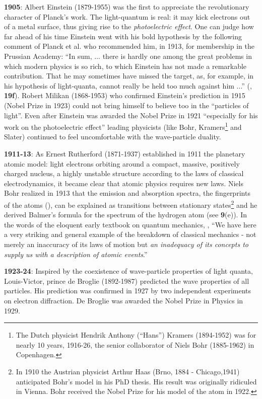{\bf 1905}: Albert Einstein (1879-1955) was the first to appreciate the
revolutionary character of Planck's work. The light-quantum is real: it may
kick electrons out of a metal surface, thus giving rise to the {\it photoelectric
effect}. One can judge how far ahead of his time Einstein went with his bold
hypothesis by the following comment of Planck et al. who recommended him, in
1913, for membership in the Prussian Academy: ``In sum, ... there is hardly
one among the great problems in which modern physics is so rich, to which
Einstein has not made a remarkable contribution. That he may sometimes have
missed the target, as, for example, in his hypothesis of light-quanta, cannot
really be held too much against him ...'' (\cite{P}, {\bf 19f}). Robert Milikan
 (1868-1953) who confirmed Einstein's prediction in 1915 (Nobel Prize in 1923)
could not bring himself to believe too in the ``particles of light''. Even after
 Einstein was awarded the Nobel Prize in 1921 ``especially for his work on the
photoelectric effect'' leading physicists (like Bohr, Kramers\footnote{The Dutch
physicist Hendrik Anthony (``Hans'') Kramers (1894-1952) was for nearly 10
years, 1916-26, the senior collaborator of Niels Bohr (1885-1962) in Copenhagen.} 
and Slater) continued to feel uncomfortable with the wave-particle duality.

{\bf 1911-13}: As Ernest Rutherford (1871-1937) established in 1911 the
planetary atomic model: light electrons orbiting around a compact, massive,
positively charged nucleus, a highly unstable structure according to the laws
of classical electrodynamics, it became clear that atomic physics requires new
laws. Niels Bohr realized in 1913 that the emission and absorption spectra,
the fingerprints of the atoms (\cite{B05}), can be explained as transitions
between stationary states\footnote{In 1910 the Austrian physicist Arthur Haas
(Brno, 1884 - Chicago,1941) anticipated Bohr's model in his PhD thesis. His
result was originally ridiculed in Vienna. Bohr received the Nobel Prize for 
his model of the atom in 1922.} and he derived Balmer's formula for
 the spectrum of the hydrogen atom (see \cite{P86} {\bf 9}(e)). In the 
 words of the eloquent early textbook on quantum mechanics, \cite{D30}, 
 ``We have here a very striking and general example of the breakdown
 of classical mechanics - not merely an inaccuracy of its laws of motion but
{\it an inadequacy of its concepts to supply us with a description of atomic
events}.'' 

{\bf 1923-24}: Inspired by the coexistence of wave-particle properties of light
quanta, Louis-Victor, prince de Broglie (1892-1987) predicted the wave
properties of all particles. His prediction was confirmed in 1927 by two
independent experiments on electron diffraction. De Broglie was awarded the
Nobel Prize in Physics in 1929.

